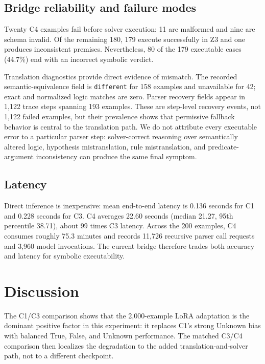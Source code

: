 \documentclass[conference]{IEEEtran}
\begin{document}


\subsection{Bridge reliability and failure modes}
Twenty C4 examples fail before solver execution: 11 are malformed and nine are schema invalid. Of the remaining 180, 179 execute successfully in Z3 and one produces inconsistent premises. Nevertheless, 80 of the 179 executable cases (44.7\%) end with an incorrect symbolic verdict.

Translation diagnostics provide direct evidence of mismatch. The recorded semantic-equivalence field is \texttt{different} for 158 examples and unavailable for 42; exact and normalized logic matches are zero. Parser recovery fields appear in 1,122 trace steps spanning 193 examples. These are step-level recovery events, not 1,122 failed examples, but their prevalence shows that permissive fallback behavior is central to the translation path. We do not attribute every executable error to a particular parser step: solver-correct reasoning over semantically altered logic, hypothesis mistranslation, rule mistranslation, and predicate-argument inconsistency can produce the same final symptom.



\subsection{Latency}
Direct inference is inexpensive: mean end-to-end latency is 0.136 seconds for C1 and 0.228 seconds for C3. C4 averages 22.60 seconds (median 21.27, 95th percentile 38.71), about 99 times C3 latency. Across the 200 examples, C4 consumes roughly 75.3 minutes and records 11,726 recursive parser call requests and 3,960 model invocations. The current bridge therefore trades both accuracy and latency for symbolic executability.

\section{Discussion}
The C1/C3 comparison shows that the 2,000-example LoRA adaptation is the dominant positive factor in this experiment: it replaces C1's strong Unknown bias with balanced True, False, and Unknown performance. The matched C3/C4 comparison then localizes the degradation to the added translation-and-solver path, not to a different checkpoint.
\end{document}
